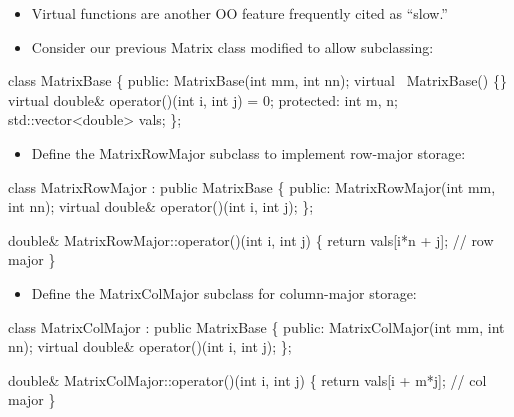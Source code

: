 \begin{frame}[fragile]
  \begin{itemize}
  \item {Virtual functions are another OO feature frequently cited as ``slow.''}
  \item {Consider our previous Matrix class modified to allow subclassing:}
  \end{itemize}
\small
\begin{semiverbatim}
class MatrixBase
\{
public:
  MatrixBase(int mm, int nn);
  virtual ~MatrixBase() \{\}
  \alert{virtual} double& operator()(int i, int j) = 0;
protected:
  int m, n;
  std::vector<double> vals;
\};
\end{semiverbatim}
\end{frame}



\begin{frame}[fragile]
  \begin{itemize}
  \item {Define the MatrixRowMajor subclass to implement row-major storage:}
  \end{itemize}
  \begin{semiverbatim}
\small
class MatrixRowMajor : public MatrixBase
\{
public:
  MatrixRowMajor(int mm, int nn);
  virtual double\& operator()(int i, int j);
\};

double\& MatrixRowMajor::operator()(int i, int j)
\{
  return vals[i*n + j]; \alert{// row major}
\}
  \end{semiverbatim}
\end{frame}



\begin{frame}[fragile]
  \begin{itemize}
  \item {Define the MatrixColMajor subclass for column-major storage:}
  \end{itemize}
\small
\begin{semiverbatim}
class MatrixColMajor : public MatrixBase
\{
public:
  MatrixColMajor(int mm, int nn);
  virtual double\& operator()(int i, int j);
\};

double\& MatrixColMajor::operator()(int i, int j)
\{
  return vals[i + m*j]; \alert{// col major}
\}
  \end{semiverbatim}
\end{frame}



